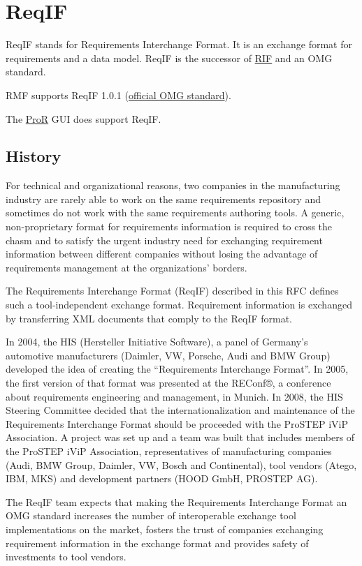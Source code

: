 \section{ReqIF}

ReqIF stands for Requirements Interchange Format.  It is an exchange format for requirements and a data model.  ReqIF is the successor of \href{RMF/RIF}{RIF} and an OMG standard.

RMF supports ReqIF 1.0.1 (\href{http://www.omg.org/spec/ReqIF/}{official OMG standard}).

The \href{RMF/ProR}{ProR} GUI does support ReqIF.

\subsection{History}

For technical and organizational reasons, two companies in the manufacturing industry are rarely able to work on the same requirements repository and sometimes do not work with the same requirements authoring tools.  A generic, non-proprietary format for requirements information is required to cross the chasm and to satisfy the urgent industry need for exchanging requirement information between different companies without losing the advantage of requirements management at the organizations' borders.

The Requirements Interchange Format (ReqIF) described in this RFC defines such a tool-independent exchange format.  Requirement information is exchanged by transferring XML documents that comply to the ReqIF format.

In 2004, the HIS (Hersteller Initiative Software), a panel of Germany's automotive manufacturers (Daimler, VW, Porsche, Audi and BMW Group) developed the idea of creating the ``Requirements Interchange Format''.  In 2005, the first version of that format was presented at the REConf®, a conference about requirements engineering and management, in Munich.  In 2008, the HIS Steering Committee decided that the internationalization and maintenance of the Requirements Interchange Format should be proceeded with the ProSTEP iViP Association.  A project was set up and a team was built that includes members of the ProSTEP iViP Association, representatives of manufacturing companies (Audi, BMW  Group, Daimler, VW, Bosch and Continental), tool vendors (Atego, IBM, MKS) and development partners (HOOD GmbH, PROSTEP AG).

The ReqIF team expects that making the Requirements Interchange Format an OMG standard increases the number of interoperable exchange tool implementations on the market, fosters the trust of companies exchanging requirement information in the exchange format and provides safety of investments to tool vendors.

